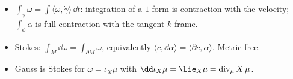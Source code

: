 \begin{keypoints}
\begin{itemize}
\item $\int_\gamma\omega=\int\langle\omega,\dot\gamma\rangle\,\dd t$: integration of a $1$-form is contraction with the velocity; $\int_\phi\alpha$ is full contraction with the tangent $k$-frame.
\item Stokes: $\int_M\dd\omega=\int_{\partial M}\omega$, equivalently $\langle c,\dd\alpha\rangle=\langle\partial c,\alpha\rangle$. Metric-free.
\item Gauss is Stokes for $\omega=\iota_X\mu$ with $\dd\iota_X\mu=\Lie_X\mu=\operatorname{div}_\mu X\,\mu$.
\end{itemize}
\end{keypoints}
